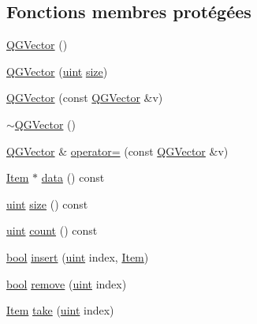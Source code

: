 \subsection*{Fonctions membres protégées}
\begin{DoxyCompactItemize}
\item 
\hyperlink{class_q_g_vector_a41cabe3e7cb2c6972f62c1cd5b92cc22}{Q\+G\+Vector} ()
\item 
\hyperlink{class_q_g_vector_a13dcf494445ce742cb6e71fe5cf1b747}{Q\+G\+Vector} (\hyperlink{qglobal_8h_a4d3943ddea65db7163a58e6c7e8df95a}{uint} \hyperlink{class_q_g_vector_a1f9577ed515f8fc9e3b883a36049e2f6}{size})
\item 
\hyperlink{class_q_g_vector_aabb624cce7dbdbcc63335f25e089228a}{Q\+G\+Vector} (const \hyperlink{class_q_g_vector}{Q\+G\+Vector} \&v)
\item 
\hyperlink{class_q_g_vector_a801da0737d11c2ff85303ee285dc424b}{$\sim$\+Q\+G\+Vector} ()
\item 
\hyperlink{class_q_g_vector}{Q\+G\+Vector} \& \hyperlink{class_q_g_vector_a460c0560413d93cf0e51f0a01b64b5ef}{operator=} (const \hyperlink{class_q_g_vector}{Q\+G\+Vector} \&v)
\item 
\hyperlink{class_q_collection_ac6f3ddbf999e31fb797927f71ae6b5d7}{Item} $\ast$ \hyperlink{class_q_g_vector_a3a9cc261495759e40c1f97f9f45db15c}{data} () const 
\item 
\hyperlink{qglobal_8h_a4d3943ddea65db7163a58e6c7e8df95a}{uint} \hyperlink{class_q_g_vector_a1f9577ed515f8fc9e3b883a36049e2f6}{size} () const 
\item 
\hyperlink{qglobal_8h_a4d3943ddea65db7163a58e6c7e8df95a}{uint} \hyperlink{class_q_g_vector_aaa8c50b46dd04be4090a71d094584835}{count} () const 
\item 
\hyperlink{qglobal_8h_a1062901a7428fdd9c7f180f5e01ea056}{bool} \hyperlink{class_q_g_vector_a1c047eefbab23bd18ac724d7bf31f7eb}{insert} (\hyperlink{qglobal_8h_a4d3943ddea65db7163a58e6c7e8df95a}{uint} index, \hyperlink{class_q_collection_ac6f3ddbf999e31fb797927f71ae6b5d7}{Item})
\item 
\hyperlink{qglobal_8h_a1062901a7428fdd9c7f180f5e01ea056}{bool} \hyperlink{class_q_g_vector_ac2192d68c03bbf2b79100fb260bf2e94}{remove} (\hyperlink{qglobal_8h_a4d3943ddea65db7163a58e6c7e8df95a}{uint} index)
\item 
\hyperlink{class_q_collection_ac6f3ddbf999e31fb797927f71ae6b5d7}{Item} \hyperlink{class_q_g_vector_a3b47c58132f741705a4c1b86dccbbef5}{take} (\hyperlink{qglobal_8h_a4d3943ddea65db7163a58e6c7e8df95a}{uint} index)

\end{DoxyCompactItemize}
